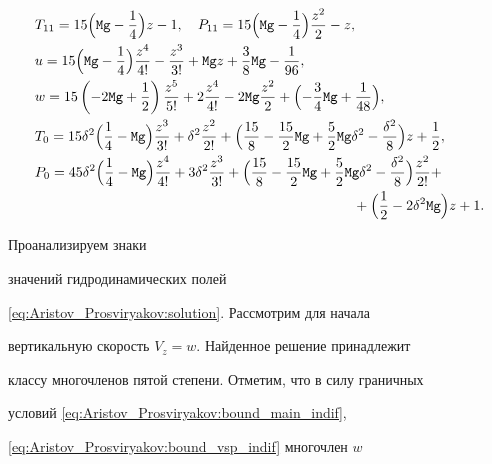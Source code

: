 \begin{equation}

\label{eq:Aristov_Prosviryakov:solution}

\begin{aligned}

&T_{11}=15\Bigl({\tt Mg}-\frac{1}{4} \Bigr)z-1, \quad 

P_{11}=15\Bigl({\tt Mg}-\frac{1}{4} \Bigr)\frac{z^2}{2}-z,\\

&u=15\Bigl({\tt Mg}-\frac{1}{4} \Bigr)\frac{z^4}{4!}-\frac{z^3}{3!}+{\tt Mg}z+\frac{3}{8}{\tt Mg}-\frac{1}{96},\\

&w=15\left(-2{\tt Mg}+\frac{1}{2}

\right)\frac{z^5}{5!}+2\frac{z^4}{4!}-2{\tt Mg}\frac{z^2}{2}+\Bigl( -\frac{3}{4}{\tt Mg}+\frac{1}{48}\Bigr),\\

&T_0=15\delta^2\Bigl(\frac{1}{4} -{\tt Mg} \Bigr)\frac{z^3}{3!}+\delta^2\frac{z^2}{2!}+\Bigl(\frac{15}{8}-\frac{15}{2}{\tt Mg}+\frac{5}{2}{\tt Mg}\delta^2-\frac{\delta^2}{8}\Bigr)z+\frac{1}{2}, \\

&P_0=45\delta^2\Bigl(\frac{1}{4} -{\tt Mg} \Bigr)\frac{z^4}{4!}+3\delta^2\frac{z^3}{3!}+\Bigl(\frac{15}{8}-\frac{15}{2}{\tt Mg}+\frac{5}{2}{\tt Mg}\delta^2-\frac{\delta^2}{8}\Bigr)\frac{z^2}{2!}+\\

& \hspace{8cm} +\Bigl( \frac{1}{2}-2\delta^2{\tt Mg}\Bigr)z+1 .

\end{aligned}

\end{equation}



\smallskip



 Проанализируем знаки

значений гидродинамических полей

\eqref{eq:Aristov_Prosviryakov:solution}. Рассмотрим для начала

вертикальную скорость $V_z=w$. Найденное решение принадлежит

классу многочленов пятой степени. Отметим, что в силу граничных

условий \eqref{eq:Aristov_Prosviryakov:bound_main_indif},

\eqref{eq:Aristov_Prosviryakov:bound_vsp_indif} многочлен $w$


